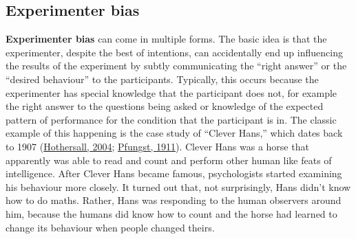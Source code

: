 \documentclass[
]{book}
\begin{document}
\hypertarget{experimenter-bias}{%
\subsection{Experimenter bias}\label{experimenter-bias}}

{\textbf{Experimenter bias}} can come in multiple forms. The basic idea is that the experimenter, despite the best of intentions, can accidentally end up influencing the results of the experiment by subtly communicating the ``right answer'' or the ``desired behaviour'' to the participants. Typically, this occurs because the experimenter has special knowledge that the participant does not, for example the right answer to the questions being asked or knowledge of the expected pattern of performance for the condition that the participant is in. The classic example of this happening is the case study of ``Clever Hans,'' which dates back to 1907 (\protect\hyperlink{ref-Hothersall2004}{Hothersall, 2004}; \protect\hyperlink{ref-Pfungst1911}{Pfungst, 1911}). Clever Hans was a horse that apparently was able to read and count and perform other human like feats of intelligence. After Clever Hans became famous, psychologists started examining his behaviour more closely. It turned out that, not surprisingly, Hans didn't know how to do maths. Rather, Hans was responding to the human observers around him, because the humans did know how to count and the horse had learned to change its behaviour when people changed theirs.
\end{document}
